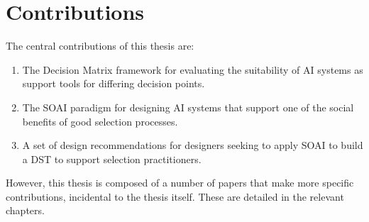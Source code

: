 \section{Contributions}
The central contributions of this thesis are:

\begin{enumerate}
    \item The Decision Matrix framework for evaluating the suitability of AI systems as support tools for differing decision points.
    \item The SOAI paradigm for designing AI systems that support one of the social benefits of good selection processes.
    \item A set of design recommendations for designers seeking to apply SOAI to build a DST to support selection practitioners.
\end{enumerate}

However, this thesis is composed of a number of papers that make more specific contributions, incidental to the thesis itself. These are detailed in the relevant chapters.




